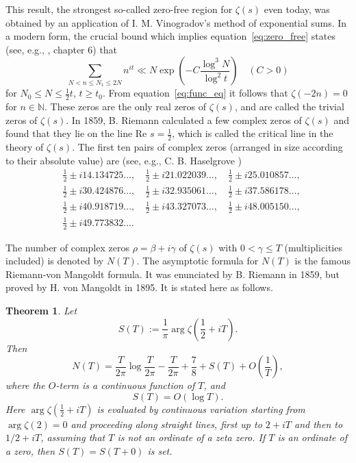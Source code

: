 \documentclass[11pt]{article}
\newtheorem{theorem}{Theorem}[section]
\begin{document}
This result, the strongest so-called zero-free region for $\zeta(s)$ even today, was obtained by an application of I. M. Vinogradov's method of exponential sums. In a modern form, the crucial bound which implies equation~\eqref{eq:zero_free} states (see, e.g., \cite{Iv1}, chapter 6) that
\begin{equation}\label{eq:vinogradov}
\sum_{N < n \leq N_1 \leq 2N} n^{it} \ll N \exp\left(-C \frac{\log^3 N}{\log^2 t}\right) \quad (C > 0)
\end{equation}
for $N_0 \leq N \leq \frac{1}{2}t$, $t \geq t_0$. From equation~\eqref{eq:func_eq} it follows that $\zeta(-2n) = 0$ for $n \in \mathbb{N}$. These zeros are the only real zeros of $\zeta(s)$, and are called the trivial zeros of $\zeta(s)$. In 1859, B. Riemann \cite{Rie} calculated a few complex zeros of $\zeta(s)$ and found that they lie on the line $\text{Re } s = \frac{1}{2}$, which is called the critical line in the theory of $\zeta(s)$. The first ten pairs of complex zeros (arranged in size according to their absolute value) are (see, e.g., C. B. Haselgrove \cite{Has})
\begin{align}\label{eq:first_zeros}
&\frac{1}{2} \pm i14.134725\ldots, \quad \frac{1}{2} \pm i21.022039\ldots, \quad \frac{1}{2} \pm i25.010857\ldots, \\
&\frac{1}{2} \pm i30.424876\ldots, \quad \frac{1}{2} \pm i32.935061\ldots, \quad \frac{1}{2} \pm i37.586178\ldots, \nonumber \\
&\frac{1}{2} \pm i40.918719\ldots, \quad \frac{1}{2} \pm i43.327073\ldots, \quad \frac{1}{2} \pm i48.005150\ldots, \nonumber \\
&\frac{1}{2} \pm i49.773832\ldots. \nonumber
\end{align}

The number of complex zeros $\rho = \beta + i\gamma$ of $\zeta(s)$ with $0 < \gamma \leq T$ (multiplicities included) is denoted by $N(T)$. The asymptotic formula for $N(T)$ is the famous Riemann-von Mangoldt formula. It was enunciated by B. Riemann \cite{Rie} in 1859, but proved by H. von Mangoldt \cite{Man} in 1895. It is stated here as follows.

\begin{theorem}\label{thm:riemann_mangoldt}
Let
\begin{equation}\label{eq:s_def}
S(T) := \frac{1}{\pi} \arg \zeta\left(\frac{1}{2} + iT\right).
\end{equation}
Then
\begin{equation}\label{eq:n_formula}
N(T) = \frac{T}{2\pi} \log \frac{T}{2\pi} - \frac{T}{2\pi} + \frac{7}{8} + S(T) + O\left(\frac{1}{T}\right),
\end{equation}
where the $O$-term is a continuous function of $T$, and
\begin{equation}\label{eq:s_bound}
S(T) = O(\log T).
\end{equation}
Here $\arg \zeta(\frac{1}{2} + iT)$ is evaluated by continuous variation starting from $\arg \zeta(2) = 0$ and proceeding along straight lines, first up to $2 + iT$ and then to $1/2 + iT$, assuming that $T$ is not an ordinate of a zeta zero. If $T$ is an ordinate of a zero, then $S(T) = S(T + 0)$ is set.
\end{theorem}
\end{document}
